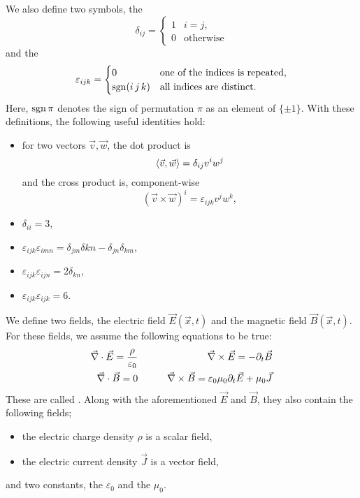 We also define two symbols, the 
\[
  \delta_{ij} =
  \begin{cases}
	1 & i = j, \\
	0 & \text{otherwise}
  \end{cases}
\]
and the 
\[
  \varepsilon_{ijk} =
  \begin{cases}
	0 & \text{one of the indices is repeated}, \\
	\operatorname{sgn} (i\,j\,k) & \text{all indices are distinct}.
  \end{cases}
\]
Here, $\operatorname{sgn} \pi$ denotes the sign of permutation $\pi$ as an element of $\{\pm
1\}$.
With these definitions, the following useful identities hold:
\begin{itemize}
\item for two vectors $\vec{v}, \vec{w}$, the dot product is
  \[
	\left< \vec{v}, \vec{w} \right> = \delta_{ij} v^i w^j
  \]
  and the cross product is, component-wise
  \[
	(\vec{v} \times \vec{w})^i = \varepsilon_{ijk} v^j w^k,
  \]
\item $\delta_{ii} = 3$,
\item $\varepsilon_{ijk} \varepsilon_{imn} = \delta_{jm} \delta{kn} -
  \delta_{jn} \delta_{km}$,
\item $\varepsilon_{ijk} \varepsilon_{ijn} = 2 \delta_{kn}$,
\item $\varepsilon_{ijk} \varepsilon_{ijk} = 6$.
\end{itemize}


We define two fields, the electric field $\vec{E}(\vec{x}, t)$ and the magnetic
field $\vec{B}(\vec{x}, t)$.
For these fields, we assume the following equations to be true:
\begin{alignat*}{2}
  \vec{\nabla}{} \cdot \vec{E} = \frac{\rho}{\varepsilon_0} & \qquad & \vec{\nabla}{} \times \vec{E} = -
													   \partial_t \vec{B} \\
  \vec{\nabla}{} \cdot \vec{B} = 0 & & \vec{\nabla}{} \times \vec{B} = \varepsilon_0 \mu_0 \partial_t \vec{E} +
					   \mu_0 \vec{J}
\end{alignat*}
These are called .
Along with the aforementioned $\vec{E}$ and $\vec{B}$, they also contain the
following fields;
\begin{itemize}
\item the electric charge density $\rho$ is a scalar field,
\item the electric current density $\vec{J}$ is a vector field,
\end{itemize}
and two constants, the  $\varepsilon_0$ and
the  $\mu_0$.

